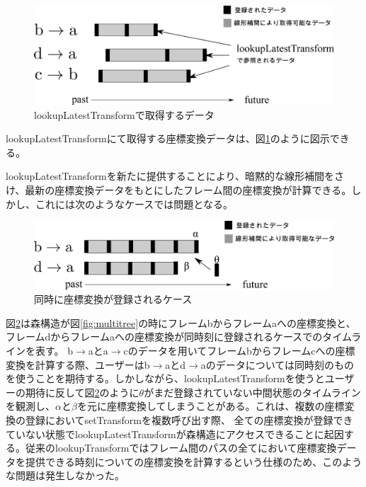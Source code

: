 \documentclass[a4paper]{jreport}	%
\begin{document}
\begin{figure}[h] 
\centering
\includegraphics[width=12cm]{lookupLatestTransform}
\caption{lookupLatestTransformで取得するデータ}
\label{fig:lookupLatestTransform}
\end{figure}

lookupLatestTransformにて取得する座標変換データは、図\ref{fig:lookupLatestTransform}のように図示できる。

lookupLatestTransformを新たに提供することにより、暗黙的な線形補間をさけ、最新の座標変換データをもとにしたフレーム間の座標変換が計算できる。しかし、これには次のようなケースでは問題となる。

\begin{figure}[h] 
\centering
\includegraphics[width=12cm]{coming-same-time}
\caption{同時に座標変換が登録されるケース}
\label{fig:coming-same-time}
\end{figure}


図\ref{fig:coming-same-time}は森構造が図\ref{fig:multitree}の時にフレームbからフレームaへの座標変換と、フレームdからフレームaへの座標変換が同時刻に登録されるケースでのタイムラインを表す。
b$\rightarrow$aとa$\rightarrow$cのデータを用いてフレームbからフレームcへの座標変換を計算する際、ユーザーはb$\rightarrow$aとd$\rightarrow$aのデータについては同時刻のものを使うことを期待する。しかしながら、lookupLatestTransformを使うとユーザーの期待に反して図\ref{fig:coming-same-time}のように$\theta$がまだ登録されていない中間状態のタイムラインを観測し、$\alpha$と$\beta$を元に座標変換してしまうことがある。これは、複数の座標変換の登録においてsetTransformを複数呼び出す際、 全ての座標変換が登録できていない状態でlookupLatestTransformが森構造にアクセスできることに起因する。従来のlookupTransformではフレーム間のパスの全てにおいて座標変換データを提供できる時刻についての座標変換を計算するという仕様のため、このような問題は発生しなかった。
\end{document}
